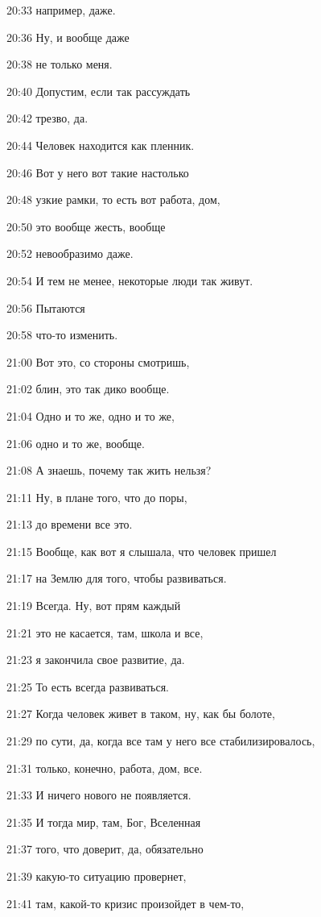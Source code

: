 20:33
например, даже.

20:36
Ну, и вообще даже

20:38
не только меня.

20:40
Допустим, если так рассуждать

20:42
трезво, да.

20:44
Человек находится как пленник.

20:46
Вот у него вот такие настолько

20:48
узкие рамки, то есть вот работа, дом,

20:50
это вообще жесть, вообще

20:52
невообразимо даже.

20:54
И тем не менее, некоторые люди так живут.

20:56
Пытаются

20:58
что-то изменить.

21:00
Вот это, со стороны смотришь,

21:02
блин, это так дико вообще.

21:04
Одно и то же, одно и то же,

21:06
одно и то же, вообще.

21:08
А знаешь, почему так жить нельзя?

21:11
Ну, в плане того, что до поры,

21:13
до времени все это.

21:15
Вообще, как вот я слышала, что человек пришел

21:17
на Землю для того, чтобы развиваться.

21:19
Всегда. Ну, вот прям каждый

21:21
это не касается, там, школа и все,

21:23
я закончила свое развитие, да.

21:25
То есть всегда развиваться.

21:27
Когда человек живет в таком, ну, как бы болоте,

21:29
по сути, да, когда все там у него все стабилизировалось,

21:31
только, конечно, работа, дом, все.

21:33
И ничего нового не появляется.

21:35
И тогда мир, там, Бог, Вселенная

21:37
того, что доверит, да, обязательно

21:39
какую-то ситуацию провернет,

21:41
там, какой-то кризис произойдет в чем-то,

